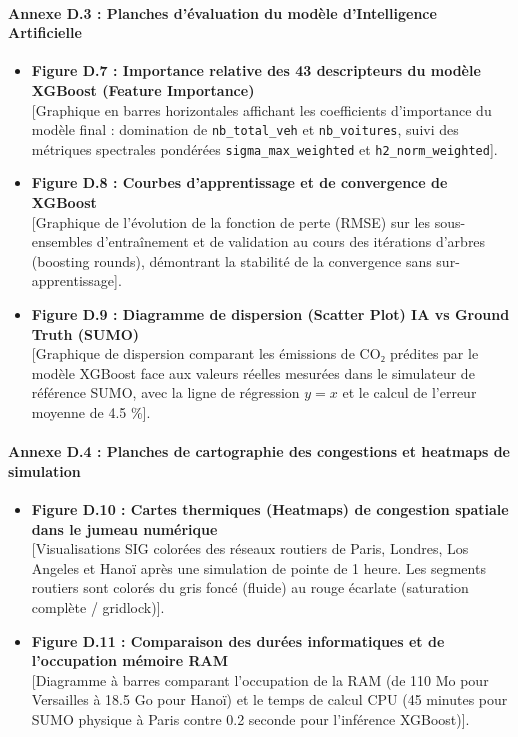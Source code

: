 \documentclass[10pt, a4paper]{article}
\providecommand{\tightlist}{}
\begin{document}
\paragraph{Annexe D.3 : Planches d'évaluation du modèle d'Intelligence
Artificielle}\label{annexe-d.3-planches-duxe9valuation-du-moduxe8le-dintelligence-artificielle}

\begin{itemize}
\tightlist
\item
  \textbf{Figure D.7 : Importance relative des 43 descripteurs du modèle
  XGBoost (Feature Importance)}\\
  {[}Graphique en barres horizontales affichant les coefficients
  d'importance du modèle final : domination de \texttt{nb\_total\_veh}
  et \texttt{nb\_voitures}, suivi des métriques spectrales pondérées
  \texttt{sigma\_max\_weighted} et \texttt{h2\_norm\_weighted}{]}.
\item
  \textbf{Figure D.8 : Courbes d'apprentissage et de convergence de
  XGBoost}\\
  {[}Graphique de l'évolution de la fonction de perte (RMSE) sur les
  sous-ensembles d'entraînement et de validation au cours des itérations
  d'arbres (boosting rounds), démontrant la stabilité de la convergence
  sans sur-apprentissage{]}.
\item
  \textbf{Figure D.9 : Diagramme de dispersion (Scatter Plot) IA vs
  Ground Truth (SUMO)}\\
  {[}Graphique de dispersion comparant les émissions de CO₂ prédites par
  le modèle XGBoost face aux valeurs réelles mesurées dans le simulateur
  de référence SUMO, avec la ligne de régression \(y=x\) et le calcul de
  l'erreur moyenne de 4.5 \%{]}.
\end{itemize}

\paragraph{Annexe D.4 : Planches de cartographie des congestions et
heatmaps de
simulation}\label{annexe-d.4-planches-de-cartographie-des-congestions-et-heatmaps-de-simulation}

\begin{itemize}
\tightlist
\item
  \textbf{Figure D.10 : Cartes thermiques (Heatmaps) de congestion
  spatiale dans le jumeau numérique}\\
  {[}Visualisations SIG colorées des réseaux routiers de Paris, Londres,
  Los Angeles et Hanoï après une simulation de pointe de 1 heure. Les
  segments routiers sont colorés du gris foncé (fluide) au rouge
  écarlate (saturation complète / gridlock){]}.
\item
  \textbf{Figure D.11 : Comparaison des durées informatiques et de
  l'occupation mémoire RAM}\\
  {[}Diagramme à barres comparant l'occupation de la RAM (de 110 Mo pour
  Versailles à 18.5 Go pour Hanoï) et le temps de calcul CPU (45 minutes
  pour SUMO physique à Paris contre 0.2 seconde pour l'inférence
  XGBoost){]}.
\end{itemize}
\end{document}
